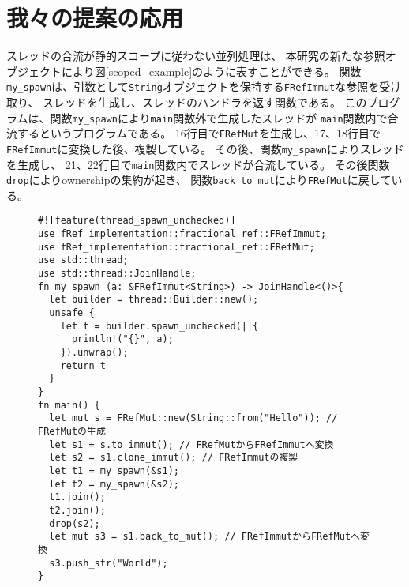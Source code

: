 \documentclass{sumiilab-paper}
\theoremstyle{mystyle}
\numberwithin{definition}{chapter} %
\begin{document}
\section{我々の提案の応用}
スレッドの合流が静的スコープに従わない並列処理は、
本研究の新たな参照オブジェクトにより図\ref{scoped_example}のように表すことができる。
関数\texttt{my\_spawn}は、引数として\texttt{String}オブジェクトを保持する\texttt{FRefImmut}な参照を受け取り、
スレッドを生成し、スレッドのハンドラを返す関数である。
このプログラムは、関数\texttt{my\_spawn}により\texttt{main}関数外で生成したスレッドが
\texttt{main}関数内で合流するというプログラムである。
16行目で\texttt{FRefMut}を生成し、17、18行目で\texttt{FRefImmut}に変換した後、複製している。
その後、関数\texttt{my\_spawn}によりスレッドを生成し、
21、22行目で\texttt{main}関数内でスレッドが合流している。
その後関数\texttt{drop}によりownershipの集約が起き、
関数\texttt{back\_to\_mut}により\texttt{FRefMut}に戻している。
\begin{figure}[htp]
\begin{lstlisting}[caption=新たな参照オブジェクトを用いた並列処理の例, 
  label=scoped_example, captionpos=b]
#![feature(thread_spawn_unchecked)]
use fRef_implementation::fractional_ref::FRefImmut;
use fRef_implementation::fractional_ref::FRefMut;
use std::thread;
use std::thread::JoinHandle;
fn my_spawn (a: &FRefImmut<String>) -> JoinHandle<()>{
  let builder = thread::Builder::new();
  unsafe {
    let t = builder.spawn_unchecked(||{
      println!("{}", a);
    }).unwrap();
    return t
  }
}
fn main() {
  let mut s = FRefMut::new(String::from("Hello")); // FRefMutの生成
  let s1 = s.to_immut(); // FRefMutからFRefImmutへ変換
  let s2 = s1.clone_immut(); // FRefImmutの複製
  let t1 = my_spawn(&s1);
  let t2 = my_spawn(&s2); 
  t1.join();
  t2.join();
  drop(s2);
  let mut s3 = s1.back_to_mut(); // FRefImmutからFRefMutへ変換
  s3.push_str("World");
}
\end{lstlisting}
\end{figure}
\end{document}
